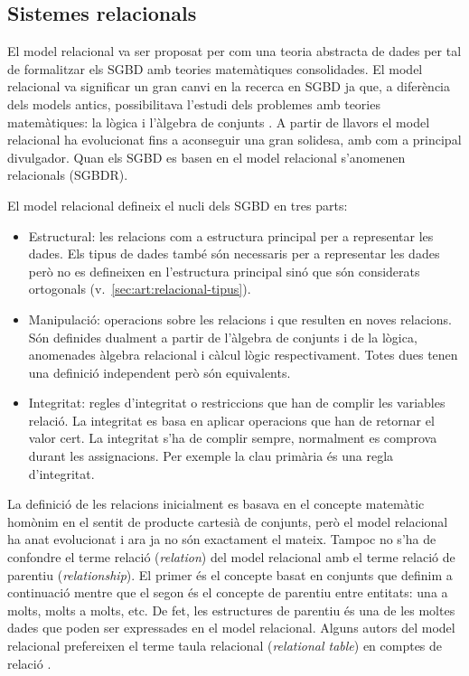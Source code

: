  


\subsection{Sistemes relacionals}
\label{sec:estat:sgbdr}

El model relacional va ser proposat per \textcite{codd69,codd70} com una
teoria abstracta de dades per tal de formalitzar els SGBD amb teories
matemàtiques consolidades.  El model relacional va significar un gran
canvi en la recerca en SGBD ja que, a diferència dels models antics,
possibilitava l'estudi dels problemes amb teories matemàtiques: la
lògica i l'àlgebra de
conjunts \parencite{atzeni13:relational_model_dead}.  A partir de
llavors el model relacional ha evolucionat fins a aconseguir una gran
solidesa, amb \textcite{date04:introduction8,date06,date:dictionary} com
a principal divulgador.  Quan els SGBD es basen en el model relacional
s'anomenen relacionals (SGBDR).



El model relacional defineix el nucli dels SGBD en tres parts:
\begin{itemize}
\item Estructural: les relacions com a estructura principal per a
  representar les dades. Els tipus de dades també són necessaris per a
  representar les dades però no es defineixen en l'estructura
  principal sinó que són considerats ortogonals
  (v.~\autoref{sec:art:relacional-tipus}).

\item Manipulació: operacions sobre les relacions i que resulten en
  noves relacions. Són definides dualment a partir de l'àlgebra de
  conjunts i de la lògica, anomenades àlgebra relacional i càlcul
  lògic respectivament. Totes dues tenen una definició independent
  però són equivalents.

\item Integritat: regles d'integritat o restriccions que han de
  complir les variables relació. La integritat es basa en aplicar
  operacions que han de retornar el valor cert. La integritat s'ha de
  complir sempre, normalment es comprova durant les assignacions.  Per
  exemple la clau primària és una regla d'integritat.
\end{itemize}


La definició de les relacions inicialment es basava en el concepte
matemàtic homònim en el sentit de producte cartesià de conjunts, però
el model relacional ha anat evolucionat i ara ja no són exactament el
mateix. Tampoc no s'ha de confondre el terme relació (\emph{relation})
del model relacional amb el terme relació de parentiu
(\emph{relationship}). El primer és el concepte basat en conjunts que
definim a continuació mentre que el segon és el concepte de parentiu
entre entitats: una a molts, molts a molts, etc. De fet, les
estructures de parentiu és una de les moltes dades que poden ser
expressades en el model relacional. Alguns autors del model relacional
prefereixen el terme taula relacional (\emph{relational table}) en
comptes de relació \parencite{dbdebunk}.



